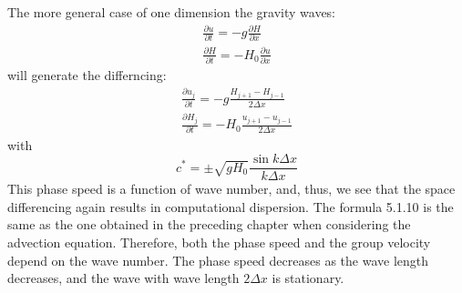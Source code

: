 The more general case of one dimension the gravity waves:
\begin{align*}
    \frac{\partial u}{\partial t}=-g\frac{\partial H}{\partial x} \\
    \frac{\partial H}{\partial t}=-H_0\frac{\partial u}{\partial x}
\end{align*}
will generate the differncing:
\begin{align}\label{5.1.6}
    \frac{\partial u_j}{\partial t}=-g\frac{H_{j+1}-H_{j-1}}{2\Delta x}\\
    \frac{\partial H_j}{\partial t}=-H_0\frac{u_{j+1}-u_{j-1}}{2\Delta x}
\end{align}
with \begin{equation}\label{5.1.10}
    c^*=\pm\sqrt{gH_0}\frac{\sin k\Delta x}{k\Delta x}
\end{equation}
This phase speed is a function of wave number, and, thus, we see that the space differencing again results in computational dispersion. The formula 5.1.10 is the same as the one obtained in the preceding chapter when considering the advection equation. Therefore, both the phase speed and the group velocity depend on the wave number. The phase speed decreases as the wave length decreases, and the wave with wave length 
$2\Delta x$ is stationary.

